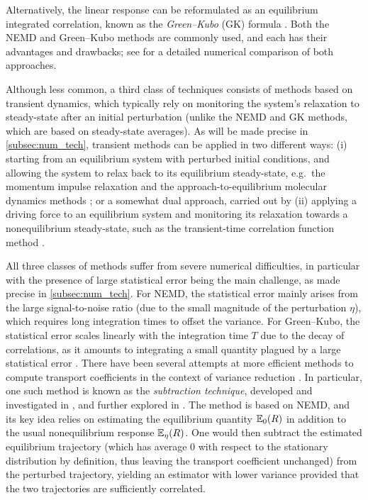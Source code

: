 Alternatively, the linear response can be reformulated as an equilibrium integrated correlation, known as the \emph{Green--Kubo} (GK) formula \cite{green1954,kubo1957}. Both the NEMD and Green--Kubo methods are commonly used, and each has their advantages and drawbacks; see \cite{stoltz2024} for a detailed numerical comparison of both approaches. 

Although less common, a third class of techniques consists of methods based on transient dynamics, which typically rely on monitoring the system's relaxation to steady-state after an initial perturbation (unlike the NEMD and GK methods, which are based on steady-state averages). As will be made precise in \cref{subsec:num_tech}, transient methods can be applied in two different ways: (i) starting from an equilibrium system with perturbed initial conditions, and allowing the system to relax back to its equilibrium steady-state, e.g.\ the momentum impulse relaxation \cite{arya2000} and the approach-to-equilibrium molecular dynamics methods \cite{lampin2013}; or a somewhat dual approach, carried out by (ii) applying a driving force to an equilibrium system and monitoring its relaxation towards a nonequilibrium steady-state, such as the transient-time correlation function method \cite{morriss1987,evans1988}.

All three classes of methods suffer from severe numerical difficulties, in particular with the presence of large statistical error being the main challenge, as made precise in \cref{subsec:num_tech}. For NEMD, the statistical error mainly arises from the large signal-to-noise ratio (due to the small magnitude of the perturbation $\eta$), which requires long integration times to offset the variance. For Green--Kubo, the statistical error scales linearly with the integration time $T$ due to the decay of correlations, as it amounts to integrating a small quantity plagued by a large statistical error \cite{sousaoliveira2017}.
%
There have been several attempts at more efficient methods to compute transport coefficients in the context of variance reduction \cite{pavliotis2023,spacek2023,blassel2024}. In particular, one such method is known as the \emph{subtraction technique}, developed and investigated in \cite{ciccotti1975}, and further explored in \cite{ciccotti1979}. The method is based on NEMD, and its key idea relies on estimating the equilibrium quantity $\mathbb{E}_0(R)$ in addition to the usual nonequilibrium response $\mathbb{E}_\eta(R)$. One would then subtract the estimated equilibrium trajectory (which has average 0 with respect to the stationary distribution by definition, thus leaving the transport coefficient unchanged) from the perturbed trajectory, yielding an estimator with lower variance provided that the two trajectories are sufficiently correlated.

